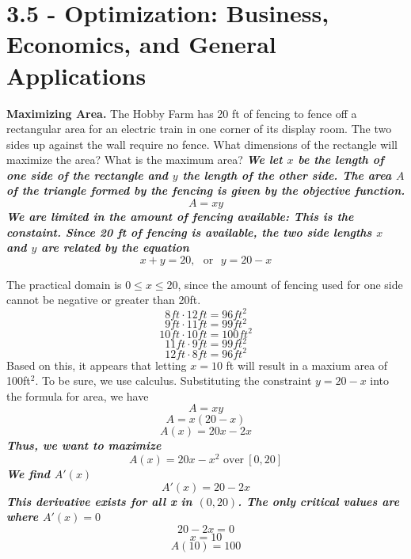 \documentclass{report}
\begin{document}
\section*{3.5 - Optimization: Business, Economics, and General Applications}
\q
\textbf{Maximizing Area.} The Hobby Farm has 20 ft of fencing to fence off a rectangular area for an electric train in one corner of its display room. The two sides up against the wall require no fence. What dimensions of the rectangle will maximize the area? What is the maximum area?
\bigbreak \noindent
\textit{\textbf{We let $x$ be the length of one side of the rectangle and $y$ the length of the other side. The area $A$ of the triangle formed by the fencing is given by the objective function.}}
$$ A = xy$$
\textit{\textbf{We are limited in the amount of fencing available: This is the constaint. Since 20 ft of fencing is available, the two side lengths $x$ and $y$ are related by the equation}}
$$ x + y =20, \ \ \ \text{or} \ \ \ y = 20-x$$
\begin{figure}[ht]
    \centering
\end{figure}
\bigbreak \noindent
The practical domain is $0\leq x\leq 20$, since the amount of fencing used for one side cannot be negative or greater than 20ft.
\bigbreak \noindent
$$8ft\cdot 12ft = 96ft^2$$
$$9ft \cdot 11ft = 99ft^2$$
$$ 10ft \cdot 10ft = 100ft^2$$
$$ 11ft \cdot 9ft = 99ft^2$$
$$ 12ft \cdot 8ft = 96ft^2$$
Based on this, it appears that letting $ x=10$ ft will result in a maxium area of 100ft$^2$. To be sure, we use calculus.
\bigbreak \noindent
Substituting the constraint $ y = 20 -x$ into the formula for area, we have
$$ A = xy$$
$$A=x(20-x)$$
$$A(x)=20x-2x$$
\textit{\textbf{Thus, we want to maximize}} 
$$A(x) = 20x-x^2 \text{ over} \ [0,20]$$
\textit{\textbf{We find $A'(x)$}}
$$A'(x) = 20-2x$$
\textit{\textbf{This derivative exists for all x in $(0,20)$. The only critical values are where $A'(x) = 0$}}
$$ 20 - 2x=0$$
$$ x = 10$$
$$\boxed{A(10) = 100}$$
\end{document}
